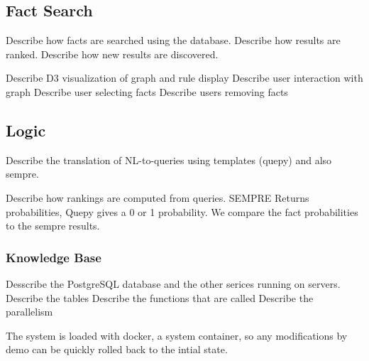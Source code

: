 \subsection{Fact Search}
\label{sec:probqa-search}
Describe how facts are searched using the database.
Describe how results are ranked.
Describe how new results are discovered.

Describe D3 visualization of graph and rule display
Describe user interaction with graph
Describe user selecting facts
Describe users removing facts


\subsection{Logic}
\label{sec:probqa-inference}
Describe the translation of NL-to-queries using templates (quepy) and also sempre.

Describe how rankings are computed from queries.
SEMPRE Returns probabilities, Quepy gives a 0 or 1 probability.
We compare the fact probabilities to the sempre results.

\subsubsection{Knowledge Base}

Desscribe the PostgreSQL database and the other serices running on servers.
Describe the tables 
Describe the functions that are called
Describe the parallelism

The system is loaded with docker, a system container, so any modifications by demo can be quickly rolled back to the intial state.






